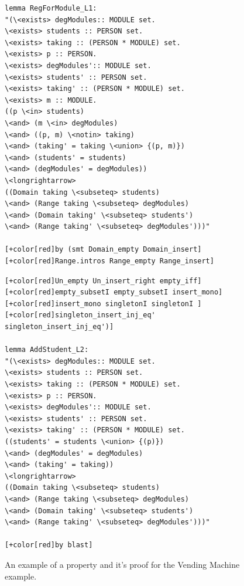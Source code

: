 \begin{figure}[H]
\centering
\begin{minipage}{0.45\textwidth}
\centering
\begin{scriptsize}
\begin{BVerbatim}[commandchars=+\[\]]
lemma RegForModule_L1:
"(\<exists> degModules:: MODULE set.
\<exists> students :: PERSON set.
\<exists> taking :: (PERSON * MODULE) set.
\<exists> p :: PERSON.
\<exists> degModules':: MODULE set.
\<exists> students' :: PERSON set.
\<exists> taking' :: (PERSON * MODULE) set.
\<exists> m :: MODULE.
((p \<in> students) 
\<and> (m \<in> degModules) 
\<and> ((p, m) \<notin> taking)
\<and> (taking' = taking \<union> {(p, m)}) 
\<and> (students' = students) 
\<and> (degModules' = degModules))
\<longrightarrow>
((Domain taking \<subseteq> students)
\<and> (Range taking \<subseteq> degModules)
\<and> (Domain taking' \<subseteq> students')
\<and> (Range taking' \<subseteq> degModules')))"

[+color[red]by (smt Domain_empty Domain_insert]
[+color[red]Range.intros Range_empty Range_insert]
\end{BVerbatim}
\end{scriptsize}
\end{minipage}\hfill
\begin{minipage}{0.45\textwidth}
\begin{scriptsize}
\begin{BVerbatim}[commandchars=+\[\]]
[+color[red]Un_empty Un_insert_right empty_iff]
[+color[red]empty_subsetI empty_subsetI insert_mono]
[+color[red]insert_mono singletonI singletonI ]
[+color[red]singleton_insert_inj_eq' singleton_insert_inj_eq')]

lemma AddStudent_L2:
"(\<exists> degModules:: MODULE set.
\<exists> students :: PERSON set.
\<exists> taking :: (PERSON * MODULE) set.
\<exists> p :: PERSON.
\<exists> degModules':: MODULE set.
\<exists> students' :: PERSON set.
\<exists> taking' :: (PERSON * MODULE) set.
((students' = students \<union> {(p)}) 
\<and> (degModules' = degModules) 
\<and> (taking' = taking))
\<longrightarrow>
((Domain taking \<subseteq> students)
\<and> (Range taking \<subseteq> degModules)
\<and> (Domain taking' \<subseteq> students')
\<and> (Range taking' \<subseteq> degModules')))"

[+color[red]by blast]
\end{BVerbatim}
\end{scriptsize}
\end{minipage}
\caption{An example of a property and it's proof for the Vending Machine example. \label{fig:propertyproof}}
\end{figure}

